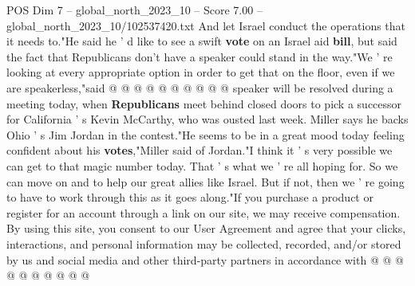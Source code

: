 \begin{textsample}{POS Dim 7 – global\_north\_2023\_10 – Score 7.00 – global\_north\_2023\_10/102537420.txt}
And let Israel conduct the operations that it needs to."He said he ' d like to see a swift \textbf{vote} on an Israel aid \textbf{bill}, but said the fact that Republicans don't have a speaker could stand in the way."We ' re looking at every appropriate option in order to get that on the floor, even if we are speakerless,"said @ @ @ @ @ @ @ @ @ @ speaker will be resolved during a meeting today, when \textbf{Republicans} meet behind closed doors to pick a successor for California ' s Kevin McCarthy, who was ousted last week.
Miller says he backs Ohio ' s Jim Jordan in the contest."He seems to be in a great mood today feeling confident about his \textbf{votes},"Miller said of Jordan."I think it ' s very possible we can get to that magic number today.
That ' s what we ' re all hoping for.
So we can move on and to help our great allies like Israel.
But if not, then we ' re going to have to work through this as it goes along."If you purchase a product or register for an account through a link on our site, we may receive compensation.
By using this site, you consent to our User Agreement and agree that your clicks, interactions, and personal information may be collected, recorded, and/or stored by us and social media and other third-party partners in accordance with @ @ @ @ @ @ @ @ @ @

\end{textsample}
